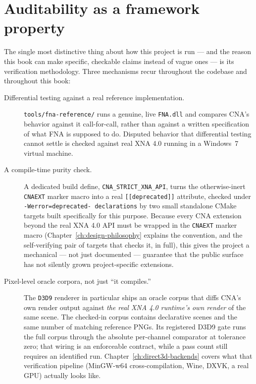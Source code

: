 \section{Auditability as a framework property}

The single most distinctive thing about how this project is run --- and the reason this book
can make specific, checkable claims instead of vague ones --- is its verification
methodology. Three mechanisms recur throughout the codebase and throughout this book:

\begin{description}
  \item[Differential testing against a real reference implementation.] \texttt{tools/fna-reference/}
        runs a genuine, live \texttt{FNA.dll} and compares CNA's behavior against it
        call-for-call, rather than against a written specification of what FNA is supposed to
        do. Disputed behavior that differential testing cannot settle is checked against real
        XNA 4.0 running in a Windows~7 virtual machine.
  \item[A compile-time purity check.] A dedicated build define, \texttt{CNA\_STRICT\_XNA\_API},
        turns the otherwise-inert \texttt{CNAEXT} marker macro into a real
        \texttt{[[deprecated]]} attribute, checked under \texttt{-Werror=deprecated-%
        declarations} by two small standalone CMake targets built specifically for this
        purpose. Because every CNA extension beyond the real XNA 4.0 API must be wrapped in the
        \texttt{CNAEXT} marker macro (Chapter~\ref{ch:design-philosophy} explains the
        convention, and the self-verifying pair of targets that checks it, in full), this gives
        the project a mechanical --- not just documented --- guarantee that the public
         surface has not silently grown project-specific
        extensions.
  \item[Pixel-level oracle corpora, not just ``it compiles.''] The \texttt{D3D9} renderer in
        particular ships an oracle corpus that diffs CNA's own render output against
        \emph{the real XNA 4.0 runtime's own render} of the same scene.  The checked-in corpus
        contains \XnaOracleSceneCount{} declarative scenes and the same number of matching
        reference PNGs. Its registered D3D9 gate runs the full corpus through the absolute
        per-channel comparator at tolerance zero; that
        wiring is an enforceable contract, while a pass count still requires an identified run.
        Chapter~\ref{ch:direct3d-backends} covers what that verification pipeline (MinGW-w64
        cross-compilation, Wine, DXVK, a real GPU) actually looks like.
\end{description}

